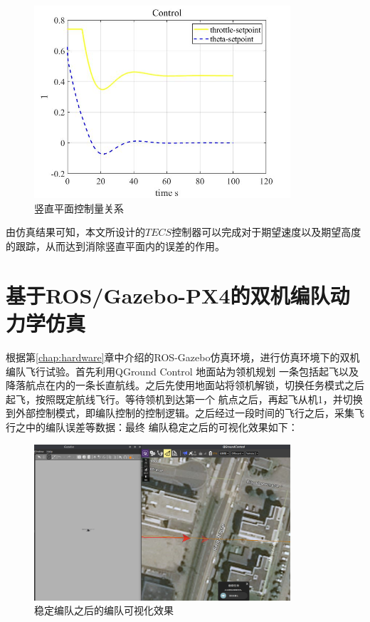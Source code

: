 \begin{figure}[H]
    \centering
    \includegraphics[width=0.85\textwidth]{figures/c5/c5-TECS-control.jpg}
    \caption{竖直平面控制量关系}\label{fig:c5-matlab-eta}
\end{figure}
由仿真结果可知，本文所设计的$TECS$控制器可以完成对于期望速度以及期望高度的跟踪，从而达到消除竖直平面内的误差的作用。
\section{基于ROS/Gazebo-PX4的双机编队动力学仿真}
根据第\ref{chap:hardware}章中介绍的ROS-Gazebo仿真环境，进行仿真环境下的双机编队飞行试验。首先利用QGround Control 地面站为领机规划
一条包括起飞以及降落航点在内的一条长直航线。之后先使用地面站将领机解锁，切换任务模式之后起飞，按照既定航线飞行。等待领机到达第一个
航点之后，再起飞从机1，并切换到外部控制模式，即编队控制的控制逻辑。之后经过一段时间的飞行之后，采集飞行之中的编队误差等数据：最终
编队稳定之后的可视化效果如下：
\begin{figure}[H]
    \centering
    \includegraphics[width=0.85\textwidth]{figures/c5/c5-real-overview}
    \caption{稳定编队之后的编队可视化效果}\label{c5-real-overview}
\end{figure}
